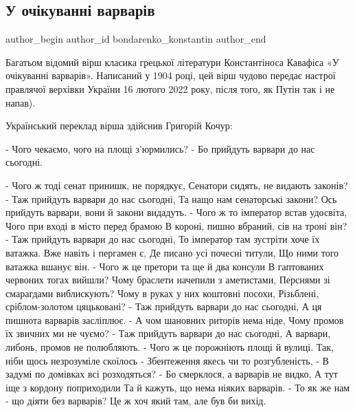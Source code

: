  
 
 
 
 
 
\subsection{У очікуванні варварів}
\label{sec:16_02_2022.fb.bondarenko_konstantin.1.u_ochikuvanni_varvariv}
 
\ifcmt
 author_begin
   author_id bondarenko_konstantin
 author_end
\fi

Багатьом відомий вірш класика грецької літератури Константіноса Кавафіса «У
очікуванні варварів». Написаний у 1904 році, цей вірш чудово передає настрої
правлячої верхівки України 16 лютого 2022 року, після того, як Путін так і не
напав).

Український переклад вірша здійснив Григорій Кочур:

- Чого чекаємо, чого на площі з'юрмились? - Бо прийдуть варвари до нас
сьогодні.

\raggedcolumns
\begin{multicols}{2} %
\setlength{\parindent}{0pt}
\obeycr
- Чого ж тоді сенат принишк, не порядкує,
Сенатори сидять, не видають законів? -
Таж прийдуть варвари до нас сьогодні,
Та нащо нам сенаторські закони?
Ось прийдуть варвари, вони й закони видадуть.
- Чого ж то імператор встав удосвіта,
Чого при вході в місто перед брамою
В короні, пишно вбраний, сів на троні він? -
Таж прийдуть варвари до нас сьогодні,
То імператор там зустріти хоче їх ватажка. 
Вже навіть і пергамен є,
Де писано усі почесні титули,
Що ними того ватажка вшанує він.
- Чого ж це претори та ще й два консули
В гаптованих червоних тогах вийшли?
Чому браслети начепили з аметистами,
Перснями зі смарагдами виблискують?
Чому в руках у них коштовні посохи,
Різьблені, сріблом-золотом цяцьковані? -
Таж прийдуть варвари до нас сьогодні,
А ця пишнота варварів засліплює.
- А чом шановних риторів нема ніде,
Чому промов їх звичних ми не чуємо? -
Таж прийдуть варвари до нас сьогодні,
А варвари, либонь, промов не полюбляють.
- Чого ж це порожніють площі й вулиці.
Так, ніби щось незрозуміле скоїлось -
Збентеження якесь чи то розгубленість, -
В задумі по домівках всі розходяться? -
Бо смерклося, а варварів не видко,
А тут іще з кордону поприходили
Та й кажуть, що нема ніяких варварів.
- То як же нам - що діяти без варварів?
Це ж хоч який там, але був би вихід.
\restorecr
\end{multicols} %
